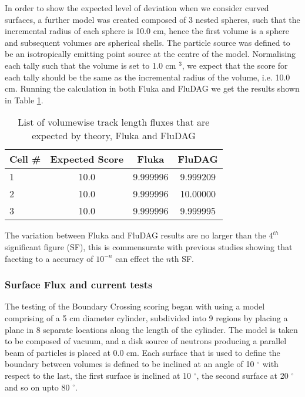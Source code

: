 \documentclass{anstrans}
\begin{document}
In order to show the expected level of deviation when we consider
curved surfaces, a further model was created composed of 3 nested
spheres, such that the incremental radius of each sphere is 10.0 cm,
hence the first volume is a sphere and subsequent volumes are
spherical shells. The particle source was defined to be an
isotropically emitting point source at the centre of the
model. Normalising each tally such that the volume is set to 1.0 cm $^3$, 
we expect that the score for each tally should be the same as the
incremental radius of the volume, i.e. 10.0 cm. Running the calculation
in both Fluka and FluDAG we get the results shown in Table \ref{usrtrack_comp_sphere}.
\begin{table}[h!]
	\begin{center}
		\begin{tabular}{|l|c|c|c|}
			\hline
			Cell \# & Expected Score & Fluka  & FluDAG \\
			\hline
			1 & 10.0 & 9.999996 & 9.999209 \\
			2 & 10.0 & 9.999996 & 10.00000 \\
			3 & 10.0 & 9.999996 & 9.999995 \\
			\hline
		\end{tabular}
		\caption{List of volumewise track length fluxes that are 
			expected by theory, Fluka and FluDAG}
	\end{center}
\label{usrtrack_comp_sphere}
\end{table}
The variation between Fluka and FluDAG results are no larger than the
$4^{th}$ significant figure (SF), this is commensurate with previous
studies \cite{snouffer_ans} showing that faceting to a accuracy of $10^{-n}$ can
effect the $n$th SF. 

\subsubsection*{Surface Flux and current tests}
The testing of the Boundary Crossing scoring began with using a model
comprising of a 5 cm diameter cylinder, subdivided into 9 regions by
placing a plane in 8 separate locations along the length of the
cylinder. The model is taken to be composed of vacuum, and a disk
source of neutrons producing a parallel beam of particles is placed at
0.0 cm. Each surface that is used to define the boundary between
volumes is defined to be inclined at an angle of 10 $^{\circ}$ with respect to the
last, the first surface is inclined at 10 $^{\circ}$, the second
surface at 20 $^{\circ}$ and so on upto 80 $^{\circ}$.
\end{document}
